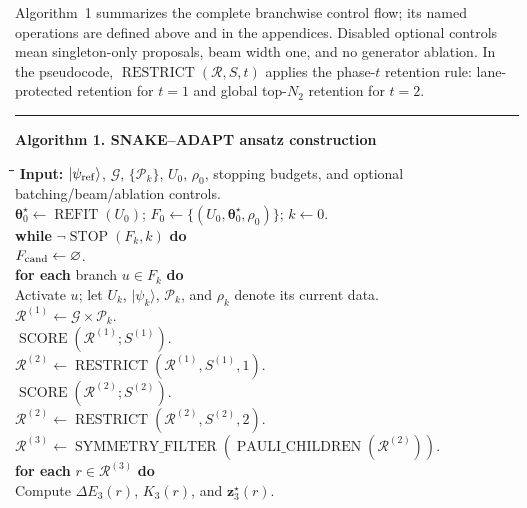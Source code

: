 \documentclass[
  reprint,
  amsmath,
  amssymb,
  aps,
  pra,
  nofootinbib,
  superscriptaddress,
  floatfix
]{revtex4-2}
\newcommand{\ket}[1]{|#1\rangle}
\begin{document}
Algorithm~1 summarizes the complete branchwise control flow; its named
operations are defined above and in the appendices. Disabled optional controls
mean singleton-only proposals, beam width one, and no generator ablation. In
the pseudocode, \(\operatorname{RESTRICT}(\mathcal R,S,t)\) applies the
phase-\(t\) retention rule: lane-protected retention for \(t=1\) and global
top-\(N_2\) retention for \(t=2\).

\begin{widetext}
\footnotesize
\noindent\rule{\textwidth}{0.4pt}
\textbf{Algorithm 1. SNAKE--ADAPT ansatz construction}
\begin{tabbing}
\hspace{1.5em}\=\hspace{1.5em}\=\hspace{1.5em}\=\hspace{1.5em}\=\kill
\textbf{Input:} \(\ket{\psi_{\rm ref}}\), \(\mathcal G\), \(\{\mathcal P_k\}\), \(U_0\), \(\rho_0\), stopping budgets, and optional batching/beam/ablation controls.\\
\(\boldsymbol\theta_0^\star\leftarrow\operatorname{REFIT}(U_0)\); \(F_0\leftarrow\{(U_0,\boldsymbol\theta_0^\star,\rho_0)\}\); \(k\leftarrow0\).\\
\textbf{while} \(\neg\operatorname{STOP}(F_k,k)\) \textbf{do}\\
\>\(F_{\rm cand}\leftarrow\varnothing\).\\
\>\textbf{for each} branch \(u\in F_k\) \textbf{do}\\
\>\>Activate \(u\); let \(U_k\), \(\ket{\psi_k}\), \(\mathcal P_k\), and \(\rho_k\) denote its current data.\\
\>\>\(\mathcal R^{(1)}\leftarrow\mathcal G\times\mathcal P_k\).\\
\>\>\(\operatorname{SCORE}(\mathcal R^{(1)};S^{(1)})\).\\
\>\>\(\mathcal R^{(2)}\leftarrow
\operatorname{RESTRICT}(\mathcal R^{(1)},S^{(1)},1)\).\\
\>\>\(\operatorname{SCORE}(\mathcal R^{(2)};S^{(2)})\).\\
\>\>\(\mathcal R^{(2)}\leftarrow
\operatorname{RESTRICT}(\mathcal R^{(2)},S^{(2)},2)\).\\
\>\>\(\mathcal R^{(3)}\leftarrow
\operatorname{SYMMETRY\_FILTER}(\operatorname{PAULI\_CHILDREN}(\mathcal R^{(2)}))\).\\
\>\>\textbf{for each} \(r\in\mathcal R^{(3)}\) \textbf{do}\\
\>\>\>Compute \(\Delta E_3(r)\), \(K_3(r)\), and \(\mathbf z_3^\star(r)\).\\

\end{tabbing}
\end{widetext}
\end{document}
